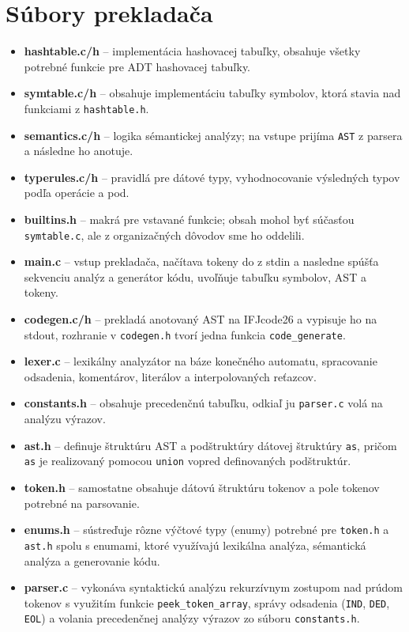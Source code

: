 \documentclass{article}
\begin{document}
\section{Súbory prekladača}
    \begin{itemize}
        \item \textbf{hashtable.c/h} -- implementácia hashovacej tabuľky, obsahuje všetky potrebné funkcie pre ADT hashovacej tabuľky.
        \item \textbf{symtable.c/h} -- obsahuje implementáciu tabuľky symbolov, ktorá stavia nad funkciami z \texttt{hashtable.h}.
        \item \textbf{semantics.c/h} -- logika sémantickej analýzy; na vstupe prijíma \texttt{AST} z parsera a následne ho anotuje.
        \item \textbf{typerules.c/h} -- pravidlá pre dátové typy, vyhodnocovanie výsledných typov podľa operácie a pod.
        \item \textbf{builtins.h} -- makrá pre vstavané funkcie; obsah mohol byť súčasťou \texttt{symtable.c}, ale z organizačných dôvodov sme ho oddelili.
        \item \textbf{main.c} -- vstup prekladača, načítava tokeny do z stdin a nasledne spúšťa sekvenciu analýz a generátor kódu, uvoľňuje tabuľku symbolov, AST a tokeny. 
        \item \textbf{codegen.c/h} -- prekladá anotovaný AST na IFJcode26 a vypisuje ho na stdout, rozhranie v \texttt{codegen.h} tvorí jedna funkcia \texttt{code\_generate}.
        \item \textbf{lexer.c} -- lexikálny analyzátor na báze konečného automatu, spracovanie odsadenia, komentárov, literálov a interpolovaných reťazcov.
        \item \textbf{constants.h} -- obsahuje precedenčnú tabuľku, odkiaľ ju \texttt{parser.c} volá na analýzu výrazov.
        \item \textbf{ast.h} -- definuje štruktúru AST a podštruktúry dátovej štruktúry \texttt{as}, pričom \texttt{as} je realizovaný pomocou \texttt{union} vopred definovaných podštruktúr.
        \item \textbf{token.h} -- samostatne obsahuje dátovú štruktúru tokenov a pole tokenov potrebné na parsovanie.
        \item \textbf{enums.h} -- sústreďuje rôzne výčtové typy (enumy) potrebné pre \texttt{token.h} a \texttt{ast.h} spolu s enumami, ktoré využívajú lexikálna analýza, sémantická analýza a generovanie kódu.
        \item \textbf{parser.c} -- vykonáva syntaktickú analýzu rekurzívnym zostupom nad prúdom tokenov s využitím funkcie \texttt{peek\_token\_array}, správy odsadenia (\texttt{IND}, \texttt{DED}, \texttt{EOL}) a volania precedenčnej analýzy výrazov zo súboru \texttt{constants.h}.
    \end{itemize}        
\end{document}

